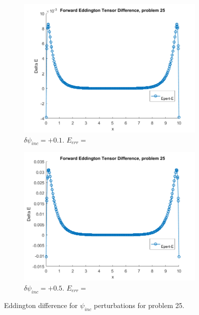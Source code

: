 \documentclass{article}
\begin{document}
\begin{figure}[H]
\centering
\begin{subfigure}{.5\textwidth}
  \centering
  \includegraphics[width=1\linewidth]{p25deltaEdBC0,1.png}
  \caption{$\delta\psi_{inc}=+0.1$. $E_{err}=$}
  \label{fig:sub1}
\end{subfigure}%
\begin{subfigure}{.5\textwidth}
  \centering
  \includegraphics[width=1\linewidth]{p25deltaEdBC0,5.png}
  \caption{$\delta\psi_{inc}=+0.5$. $E_{err}= $}
  \label{fig:sub2}
\end{subfigure}
\caption{Eddington difference for $\psi_{inc}$ perturbations for problem 25.}
\label{fig:test}
\end{figure}
\end{document}
